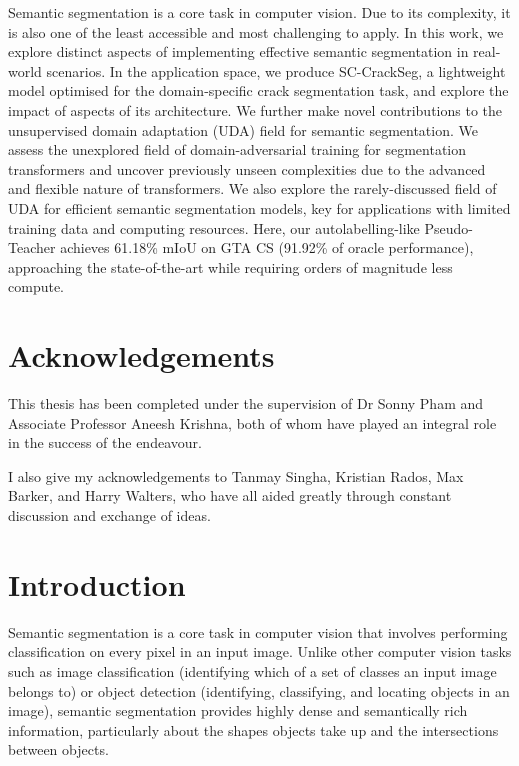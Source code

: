 \documentclass[a4paper,12pt]{report}
\begin{document}
Semantic segmentation is a core task in computer vision. Due to its complexity, it is also one of the least accessible and most challenging to apply. In this work, we explore distinct aspects of implementing effective semantic segmentation in real-world scenarios. In the application space, we produce SC-CrackSeg, a lightweight model optimised for the domain-specific crack segmentation task, and explore the impact of aspects of its architecture. We further make novel contributions to the unsupervised domain adaptation (UDA) field for semantic segmentation. We assess the unexplored field of domain-adversarial training for segmentation transformers and uncover previously unseen complexities due to the advanced and flexible nature of transformers. We also explore the rarely-discussed field of UDA for efficient semantic segmentation models, key for applications with limited training data and computing resources. Here, our autolabelling-like Pseudo-Teacher achieves 61.18\% mIoU on GTA \textrightarrow CS (91.92\% of oracle performance), approaching the state-of-the-art while requiring orders of magnitude less compute.

\newpage
\chapter*{Acknowledgements}
This thesis has been completed under the supervision of Dr Sonny Pham and Associate Professor Aneesh Krishna, both of whom have played an integral role in the success of the endeavour.

\noindent I also give my acknowledgements to Tanmay Singha, Kristian Rados, Max Barker, and Harry Walters, who have all aided greatly through constant discussion and exchange of ideas.

\newpage
\tableofcontents
\newpage
\listoffigures
\newpage
\listoftables
\newpage
\thispagestyle{empty}

% 
% 

\chapter{Introduction}
Semantic segmentation is a core task in computer vision that involves performing classification on every pixel in an input image. Unlike other computer vision tasks such as image classification (identifying which of a set of classes an input image belongs to) or object detection (identifying, classifying, and locating objects in an image), semantic segmentation provides highly dense and semantically rich information, particularly about the shapes objects take up and the intersections between objects.
\end{document}
